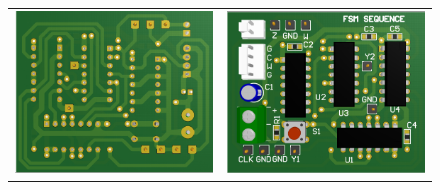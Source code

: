 \begin{figure}[H]
    \centering
    \begin{tabular}{c c}
        \includegraphics[scale=0.45]{../EJ2/Recursos/pcb_3d_bottom.PNG} & 
        \includegraphics[scale=0.45]{../EJ2/Recursos/pcb_3d_top.PNG} \\

\end{tabular}
\end{figure}
